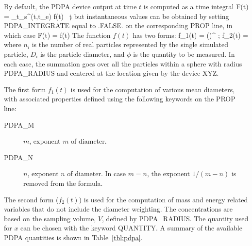 \documentclass[11pt]{book}
\begin{document}
By default, the PDPA device output at time $t$ is computed as a time integral
\be
F(t) =  \int_{t_{\rm s}}^{\min(t,t_{\rm e})} f(t) \, \d t
\ee
but instantaneous values can be obtained by setting {\ct PDPA\_INTEGRATE} equal to {\ct .FALSE.} on the corresponding {\ct PROP} line, in which case
\be
F(t) = f(t)
\ee
The function $f(t)$ has two forms:
\be
f_1(t) =  \left(\right)^{}
\quad ; \quad
f_2(t) = 
\ee
where $n_i$ is the number of real particles represented by the single simulated particle, $D_i$ is the particle diameter, and $\phi$ is the quantity to be measured. In each case, the summation goes over all the particles within a sphere with radius {\ct PDPA\_RADIUS} and centered at the location given by the device {\ct XYZ}.

The first form $f_1(t)$ is used for the computation of various mean diameters, with associated properties defined using the following keywords on the {\ct PROP} line:
\begin{description}
\item[{\ct PDPA\_M}] $m$, exponent $m$ of diameter.
\item[{\ct PDPA\_N}] $n$, exponent $n$ of diameter. In case $m=n$, the exponent $1/(m-n)$ is removed from the formula.
\end{description}
The second form ($f_2(t)$) is used for the computation of mass and energy related variables that do not include the diameter weighting. The concentrations are based on the sampling volume, $V$, defined by {\ct PDPA\_RADIUS}. The quantity used for $x$ can be chosen with the keyword {\ct QUANTITY}. A summary of the available PDPA quantities is shown in Table~\ref{tbl:pdpa}.
\end{document}
